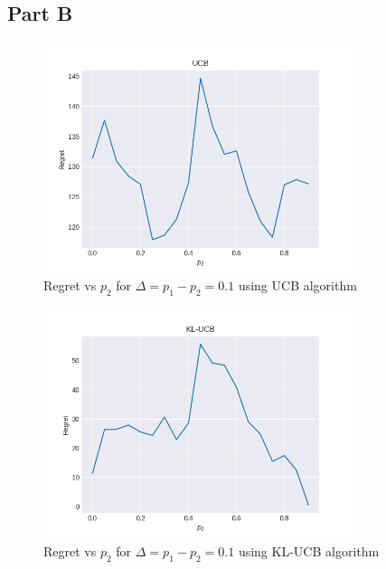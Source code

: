 \documentclass[11pt]{article}
\begin{document}
 \subsection*{Part B}
 \begin{figure}[H]
     \begin{center}
         \includegraphics[width=0.8\textwidth]{../images/task2bucb.png}
         
         \caption{Regret vs $p_2$ for $\Delta = p_1 - p_2 = 0.1$ using UCB algorithm}
     \end{center}
  \end{figure}

  \begin{figure}[H]
    \begin{center}
        \includegraphics[width=0.8\textwidth]{../images/task2bklucb.png}
        
        \caption{Regret vs $p_2$ for $\Delta = p_1 - p_2 = 0.1$ using KL-UCB algorithm}
    \end{center}
 \end{figure}
\end{document}
